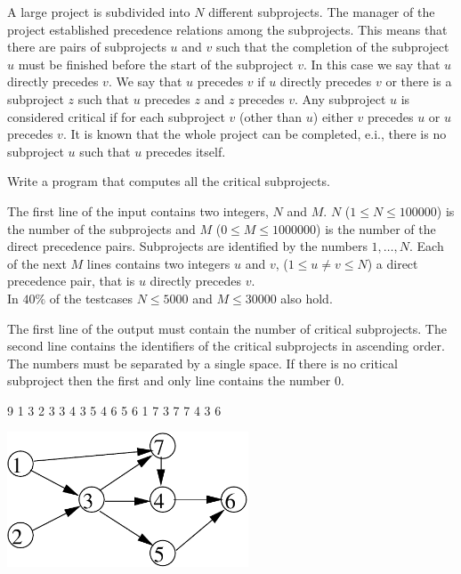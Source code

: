 





A large project is subdivided into $N$ different subprojects. The manager of the project established precedence relations among the subprojects. This means that there are pairs of subprojects $u$ and $v$ such that the completion of the subproject $u$ must be finished before the start of the subproject $v$. In this case we say that $u$ directly precedes $v$. We say that $u$ precedes $v$ if $u$ directly precedes $v$ or there is a subproject $z$ such that $u$ precedes $z$ and $z$ precedes $v$.
Any subproject $u$ is considered critical if for each subproject $v$ (other than $u$) either $v$ precedes $u$ or $u$ precedes $v$. It is known that the whole project can be completed, e.i., there is no subproject $u$ such that $u$ precedes itself.

Write a program that computes all the critical subprojects.

The first line of the input contains two integers, $N$ and $M$. $N$ ($1 \leq N \leq 100000$) is the number of the subprojects and $M$ ($0 \leq M \leq 1000000$) is the number of the direct precedence pairs. Subprojects are identified by the numbers $1, \ldots ,N$. Each of the next $M$ lines contains two integers $u$ and $v$, ($1 \leq u \neq v \leq N$) a direct precedence pair, that is $u$ directly precedes $v$.\\
\bigskip
In $40 \%$ of the testcases $N \leq 5000$ and $M \leq 30000$ also hold.

The first line of the output must contain the number of critical subprojects. The second line contains the identifiers of the critical subprojects in ascending order. The numbers must be separated by a single space. If there is no critical subproject then the first and only line contains the number 0.


 9
1 3
2 3
3 4
3 5
4 6
5 6
1 7
3 7
7 4
3 6
\sampleCOMMENT

\sampleEND

\includegraphics[height=4cm]{img/critical-fig.pdf}
\bigskip



